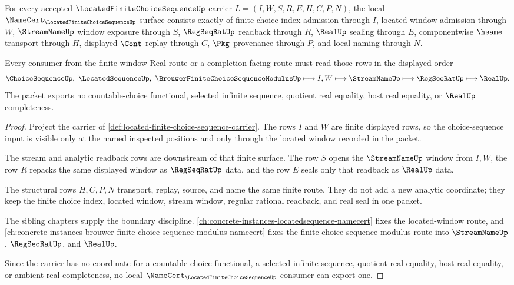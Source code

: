 \begin{theorem}
\label{thm:located-finite-choice-sequence-namecert-obligations}
For every accepted $\LocatedFiniteChoiceSequenceUp$ carrier $L=(I,W,S,R,E,H,C,P,N)$, the local $\NameCert_{\LocatedFiniteChoiceSequenceUp}$ surface consists exactly of finite choice-index admission through $I$, located-window admission through $W$, $\StreamNameUp$ window exposure through $S$, $\RegSeqRatUp$ readback through $R$, $\RealUp$ sealing through $E$, componentwise $\hsame$ transport through $H$, displayed $\Cont$ replay through $C$, $\Pkg$ provenance through $P$, and local naming through $N$.

Every consumer from the finite-window Real route or a completion-facing route must read those rows in the displayed order
$$
\ChoiceSequenceUp,\ \LocatedSequenceUp,\ \BrouwerFiniteChoiceSequenceModulusUp
\longmapsto I,W
\longmapsto \StreamNameUp
\longmapsto \RegSeqRatUp
\longmapsto \RealUp .
$$
The packet exports no countable-choice functional, selected infinite sequence, quotient real equality, host real equality, or $\RealUp$ completeness.
\end{theorem}
\begin{proof}
Project the carrier of \autoref{def:located-finite-choice-sequence-carrier}. The rows $I$ and $W$ are finite displayed rows, so the choice-sequence input is visible only at the named inspected positions and only through the located window recorded in the packet.

The stream and analytic readback rows are downstream of that finite surface. The row $S$ opens the $\StreamNameUp$ window from $I,W$, the row $R$ repacks the same displayed window as $\RegSeqRatUp$ data, and the row $E$ seals only that readback as $\RealUp$ data.

The structural rows $H,C,P,N$ transport, replay, source, and name the same finite route. They do not add a new analytic coordinate; they keep the finite choice index, located window, stream window, regular rational readback, and real seal in one packet.

The sibling chapters supply the boundary discipline. \autoref{ch:concrete-instances-locatedsequence-namecert} fixes the located-window route, and \autoref{ch:concrete-instances-brouwer-finite-choice-sequence-modulus-namecert} fixes the finite choice-sequence modulus route into $\StreamNameUp$, $\RegSeqRatUp$, and $\RealUp$.

Since the carrier has no coordinate for a countable-choice functional, a selected infinite sequence, quotient real equality, host real equality, or ambient real completeness, no local $\NameCert_{\LocatedFiniteChoiceSequenceUp}$ consumer can export one.
\end{proof}

